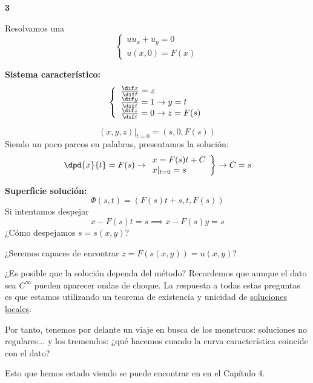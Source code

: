 	\begin{example}{\bf 3}

		Resolvamos una 
		\[
			\left\{
			\begin{array}{l}
				uu_x + u_y = 0 \\
				u(x,0) = F(x)
			\end{array}
			\right.
		\]

		\textbf{Sistema característico:}
		\[
			\left\{
			\begin{array}{l}
				\frac{\dif x}{\dif t} = z \\
				\frac{\dif y}{\dif t} = 1 \rightarrow y = t \\
				\frac{\dif z}{\dif t} = 0 \rightarrow z = F(s) \\
			\end{array}
			\right.
		\]

		$$(x,y,z) |_{t=0} = (s,0,F(s))$$
		Siendo un poco parcos en palabras, presentamos la solución:
		\[
			\left.
			\dpd{x}{t} = F(s) \rightarrow \\
			\begin{array}{l}
				x = F(s)t + C \\
				x |_{t=0} = s
			\end{array}
			\right\} \rightarrow C = s
		\]

		\textbf{Superficie solución:}
		$$\Phi(s,t) = (F(s) t + s, t , F(s))$$
		Si intentamos despejar
		$$x - F(s)t = s \implies x-F(s)y = s$$
		¿Cómo despejamos $s = s(x,y)$?

		\noindent¿Seremos capaces de encontrar $z = F(s(x,y)) = u(x,y)$?


		\noindent¿Es posible que la solución dependa del método? Recordemos que aunque el dato sea $C^\infty$ pueden aparecer ondas de choque. La respuesta a todas estas preguntas es que estamos utilizando un teorema de existencia y unicidad de \underline{soluciones locales}.

		\noindent Por tanto, tenemos por delante un viaje en busca de los monstruos: soluciones no regulares... y los tremendos: ¿qué hacemos cuando la curva característica coincide con el dato?

	\end{example}


	Esto que hemos estado viendo se puede encontrar en \cite{salsaPDE} en el Capítulo 4.

